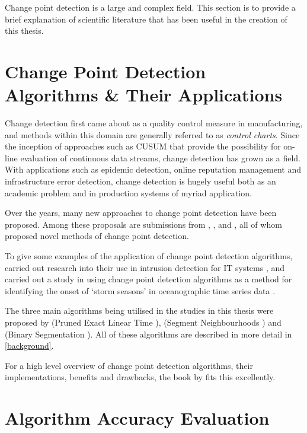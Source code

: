 \documentclass[../main.tex]{subfiles}
\begin{document}
Change point detection is a large and complex field. This section is to provide a brief explanation of scientific literature that has been useful in the creation of this thesis.

\section{Change Point Detection Algorithms \& Their Applications}

Change detection first came about as a quality control measure in manufacturing, and methods within this domain are generally referred to as \emph{control charts}. Since the inception of approaches such as CUSUM \cite{Page1954} that provide the possibility for on-line evaluation of continuous data streams, change detection has grown as a field. With applications such as epidemic detection, online reputation management and infrastructure error detection, change detection is hugely useful both as an academic problem and in production systems of myriad application.

Over the years, many new approaches to change point detection have been proposed. Among these proposals are submissions from \citeauthor{Desobry2005} \cite{Desobry2005}, \citeauthor{Kawahara2009} \cite{Kawahara2009}, and \citeauthor{Downey2008} \cite{Downey2008}, all of whom proposed novel methods of change point detection.

To give some examples of the application of change point detection algorithms, \citeauthor{Tartakovsky2005} carried out research into their use in intrusion detection for IT systems \cite{Tartakovsky2005}, and \citeauthor{Killick2011} carried out a study in using change point detection algorithms as a method for identifying the onset of `storm seasons' in oceanographic time series data \cite{Killick2011}.

The three main algorithms being utilised in the studies in this thesis were proposed by \citeauthor{Killick2011a} (Pruned Exact Linear Time \cite{Killick2011a}), \citeauthor{Auger1989} (Segment Neighbourhoods \cite{Auger1989}) and \citeauthor{Jackson2003} (Binary Segmentation \cite{Jackson2003}). All of these algorithms are described in more detail in \autoref{background}.

For a high level overview of change point detection algorithms, their implementations, benefits and drawbacks, the book  by \citeauthor{Basseville1993} \cite{Basseville1993} fits this excellently.

\section{Algorithm Accuracy Evaluation}
\end{document}
